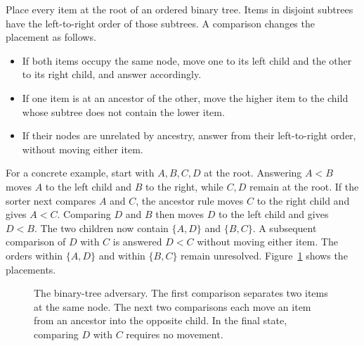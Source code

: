 Place every item at the root of an ordered binary tree. Items in disjoint
subtrees have the left-to-right order of those subtrees. A comparison changes
the placement as follows.
\begin{itemize}
\item If both items occupy the same node, move one to its left child and
the other to its right child, and answer accordingly.
\item If one item is at an ancestor of the other, move the higher item to
the child whose subtree does not contain the lower item.
\item If their nodes are unrelated by ancestry, answer from their
left-to-right order, without moving either item.
\end{itemize}
For a concrete example, start with $A,B,C,D$ at the root.
Answering $A<B$ moves $A$ to the left child and $B$ to the right, while
$C,D$ remain at the root. If the sorter next compares $A$ and $C$, the
ancestor rule moves $C$ to the right child and gives $A<C$.
Comparing $D$ and $B$ then moves $D$ to the left child and gives $D<B$.
The two children now contain $\{A,D\}$ and $\{B,C\}$.
A subsequent comparison of $D$ with $C$ is answered $D<C$ without moving
either item. The orders within $\{A,D\}$ and within $\{B,C\}$ remain
unresolved. Figure~\ref{fig:binary-example} shows the placements.

\begin{figure}[htbp]
\centering
{}
\caption{The binary-tree adversary. The first comparison separates two
items at the same node. The next two comparisons each move an item from
an ancestor into the opposite child. In the final state, comparing $D$
with $C$ requires no movement.}
\label{fig:binary-example}
\end{figure}

